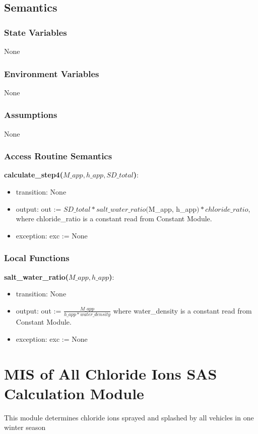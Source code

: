 \documentclass[12pt, titlepage]{article}
\begin{document}
\subsection{Semantics}

\subsubsection{State Variables}
None

\subsubsection{Environment Variables}
None
\subsubsection{Assumptions}
None
\subsubsection{Access Routine Semantics}

\noindent \textbf{calculate\_step4($M\_app, h\_app, SD\_total$)}:
\begin{itemize}
\item transition: None
\item output: out := $SD\_total * salt\_water\_ratio($M\_app, h\_app$) * chloride\_ratio$, where chloride\_ratio is a constant read from Constant Module.
\item exception: exc := None
\end{itemize}

\subsubsection{Local Functions}
\noindent \textbf{salt\_water\_ratio($M\_app, h\_app$)}:
\begin{itemize}
\item transition: None
\item output: out := $\frac{M\_app}{h\_app*water\_density}$ where water\_density is a constant read from Constant Module.
\item exception: exc := None
\end{itemize}

\newpage

\section{MIS of All Chloride Ions SAS Calculation Module} \label{allChlorideIonsSASCalculationModule}
This module determines chloride ions sprayed and splashed by all vehicles in one winter season
\end{document}
